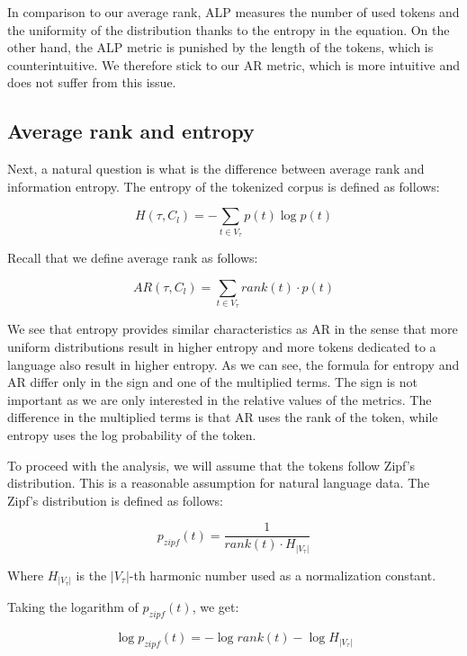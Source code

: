 In comparison to our average rank, ALP measures the number of used tokens and the uniformity of the distribution thanks to the entropy in the equation. On the other hand, the ALP metric is punished by the length of the tokens, which is counterintuitive. We therefore stick to our AR metric, which is more intuitive and does not suffer from this issue.


\subsection{Average rank and entropy}

Next, a natural question is what is the difference between average rank and information entropy. The entropy of the tokenized corpus is defined as follows:

\begin{equation}
    H(\tau, C_l) = - \sum_{t \in V_\tau} p(t) \log p(t)
\end{equation}

Recall that we define average rank as follows:

\begin{equation}
    AR(\tau, C_l) = \sum_{t \in V_\tau} rank(t) \cdot p(t)
\end{equation}

We see that entropy provides similar characteristics as AR in the sense that more uniform distributions result in higher entropy and more tokens dedicated to a language also result in higher entropy. As we can see, the formula for entropy and AR differ only in the sign and one of the multiplied terms. The sign is not important as we are only interested in the relative values of the metrics. The difference in the multiplied terms is that AR uses the rank of the token, while entropy uses the log probability of the token. 

To proceed with the analysis, we will assume that the tokens follow Zipf's distribution. This is a reasonable assumption for natural language data. The Zipf's distribution is defined as follows:

\begin{equation}
    p_{zipf}(t) = \frac{1}{rank(t) \cdot H_{|V_\tau|}}
\end{equation}

Where $H_{|V_\tau|}$ is the $|V_\tau|$-th harmonic number used as a normalization constant.

Taking the logarithm of $p_{zipf}(t)$, we get:

\begin{equation}
    \log p_{zipf}(t) = - \log rank(t) - \log H_{|V_\tau|}
\end{equation}


